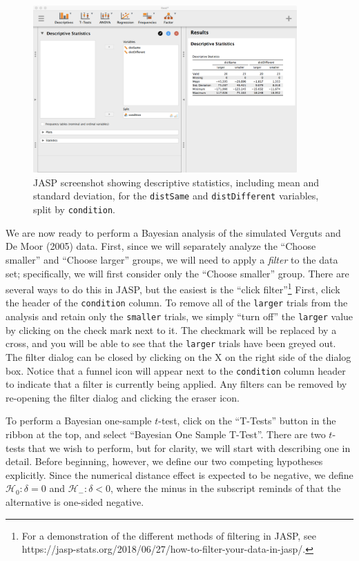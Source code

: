 \documentclass[english,,doc,floatsintext]{apa6}
\let\rmarkdownfootnote\footnote%
\def\footnote{\protect\rmarkdownfootnote}
\begin{document}
\begin{figure}
\centering
\includegraphics[width=0.9\textwidth,height=\textheight]{figures/ttestDescriptives.png}
\caption{\label{fig:ttestDescriptives}JASP screenshot showing descriptive statistics, including mean and standard deviation, for the \texttt{distSame} and \texttt{distDifferent} variables, split by \texttt{condition}.}
\end{figure}

We are now ready to perform a Bayesian analysis of the simulated Verguts and De Moor (2005) data. First, since we will separately analyze the \enquote{Choose smaller} and \enquote{Choose larger} groups, we will need to apply a \emph{filter} to the data set; specifically, we will first consider only the \enquote{Choose smaller} group. There are several ways to do this in JASP, but the easiest is the \enquote{click filter}\footnote{For a demonstration of the different methods of filtering in JASP, see https://jasp-stats.org/2018/06/27/how-to-filter-your-data-in-jasp/.} First, click the header of the \texttt{condition} column. To remove all of the \texttt{larger} trials from the analysis and retain only the \texttt{smaller} trials, we simply \enquote{turn off} the \texttt{larger} value by clicking on the check mark next to it. The checkmark will be replaced by a cross, and you will be able to see that the \texttt{larger} trials have been greyed out. The filter dialog can be closed by clicking on the X on the right side of the dialog box. Notice that a funnel icon will appear next to the \texttt{condition} column header to indicate that a filter is currently being applied. Any filters can be removed by re-opening the filter dialog and clicking the eraser icon.

To perform a Bayesian one-sample \(t\)-test, click on the \enquote{T-Tests} button in the ribbon at the top, and select \enquote{Bayesian One Sample T-Test}. There are two \(t\)-tests that we wish to perform, but for clarity, we will start with describing one in detail. Before beginning, however, we define our two competing hypotheses explicitly. Since the numerical distance effect is expected to be negative, we define \(\mathcal{H}_{0}:\delta = 0\) and \(\mathcal{H}_{-}:\delta < 0\), where the minus in the subscript reminds of that the alternative is one-sided negative.
\end{document}
